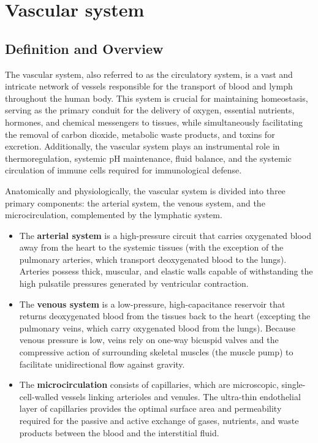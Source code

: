 \chapter{Vascular system}

\section*{Definition and Overview}
The vascular system, also referred to as the circulatory system, is a vast and intricate network of vessels responsible for the transport of blood and lymph throughout the human body. This system is crucial for maintaining homeostasis, serving as the primary conduit for the delivery of oxygen, essential nutrients, hormones, and chemical messengers to tissues, while simultaneously facilitating the removal of carbon dioxide, metabolic waste products, and toxins for excretion. Additionally, the vascular system plays an instrumental role in thermoregulation, systemic pH maintenance, fluid balance, and the systemic circulation of immune cells required for immunological defense.

Anatomically and physiologically, the vascular system is divided into three primary components: the arterial system, the venous system, and the microcirculation, complemented by the lymphatic system.
\begin{itemize}
    \item The \textbf{arterial system} is a high-pressure circuit that carries oxygenated blood away from the heart to the systemic tissues (with the exception of the pulmonary arteries, which transport deoxygenated blood to the lungs). Arteries possess thick, muscular, and elastic walls capable of withstanding the high pulsatile pressures generated by ventricular contraction.
    \item The \textbf{venous system} is a low-pressure, high-capacitance reservoir that returns deoxygenated blood from the tissues back to the heart (excepting the pulmonary veins, which carry oxygenated blood from the lungs). Because venous pressure is low, veins rely on one-way bicuspid valves and the compressive action of surrounding skeletal muscles (the muscle pump) to facilitate unidirectional flow against gravity.
    \item The \textbf{microcirculation} consists of capillaries, which are microscopic, single-cell-walled vessels linking arterioles and venules. The ultra-thin endothelial layer of capillaries provides the optimal surface area and permeability required for the passive and active exchange of gases, nutrients, and waste products between the blood and the interstitial fluid.
\end{itemize}

